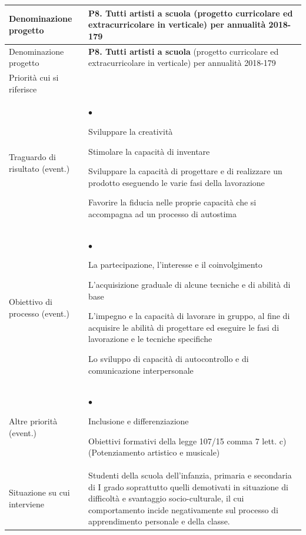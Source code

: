 \documentclass[12pt,a4paper,oneside]{memoir}
\newenvironment{elenco}{\begin{list}{$\bullet$}{%
              \setlength{\leftmargin}{4mm}%
              \setlength{\rightmargin}{1mm}%
               \setlength{\itemindent}{0mm}%
               \setlength{\labelwidth}{2mm}%
               \setlength{\labelsep}{2mm}%
              \setlength{\itemsep}{-\parsep}%
              \setlength{\partopsep}{0pt}%
              \setlength{\topsep}{0pt}%
             \setlength{\parskip}{0pt}%
              }}{\end{list}}
\begin{document}
\begin{footnotesize}
\begin{longtable}{|>{\raggedright}p{2.5cm}|>{\raggedright\arraybackslash}P{10cm}|}
\hline
{}
\label{P8}Denominazione progetto&\textbf{P8. Tutti artisti a scuola} (progetto curricolare ed extracurricolare in verticale) per annualità 2018-179\\ \hline \endfirsthead
\hline
{}
Denominazione progetto&\textbf{P8. Tutti artisti a scuola} (progetto curricolare ed extracurricolare in verticale) per annualità 2018-179\\ \hline \endhead
{}
\endfoot
\hline
\endlastfoot
Priorità cui si riferisce & \\ \hline
Traguardo di risultato (event.) &
\begin{elenco}
\item Sviluppare la creatività
\item Stimolare la capacità di inventare
\item Sviluppare la capacità di progettare e di realizzare un prodotto eseguendo le varie fasi della lavorazione
\item Favorire la fiducia nelle proprie capacità che si accompagna ad un processo di autostima
\end{elenco}\\[-4mm] \hline
Obiettivo di processo (event.) &
\begin{elenco}
\item La partecipazione, l'interesse e il coinvolgimento
\item L'acquisizione graduale di alcune tecniche e di abilità di base
\item L'impegno e la capacità di lavorare in gruppo, al fine di acquisire le abilità di progettare ed eseguire le fasi di lavorazione e le tecniche specifiche
\item Lo sviluppo di capacità di autocontrollo e di comunicazione interpersonale
\end{elenco}\\[-4mm] \hline
Altre priorità (event.)&
\begin{elenco}
\item Inclusione e differenziazione 
\item Obiettivi formativi della legge 107/15 comma 7 lett. c) (Potenziamento artistico e musicale)
\end{elenco}\\[-4mm] \hline
Situazione su cui interviene &Studenti della scuola dell'infanzia, primaria e secondaria di I grado soprattutto quelli demotivati in situazione di difficoltà e svantaggio socio-culturale, il cui comportamento incide negativamente sul processo di apprendimento personale e della classe.\\ \hline

\end{longtable}
\end{footnotesize}
\end{document}

